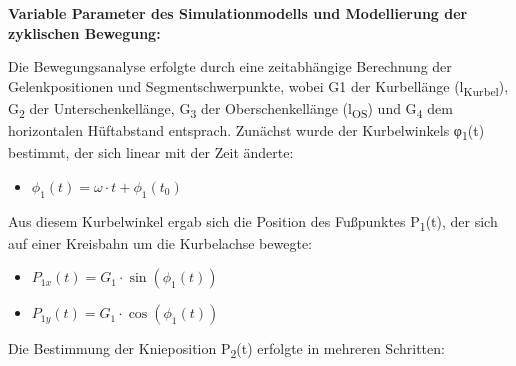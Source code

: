 \documentclass[
  letterpaper,
  DIV=11]{scrartcl}
\providecommand{\tightlist}{%
  \setlength{\itemsep}{0pt}\setlength{\parskip}{0pt}}\usepackage{longtable,booktabs,array}
\begin{document}
\textbf{Variable Parameter des Simulationmodells und Modellierung der
zyklischen Bewegung:}

Die Bewegungsanalyse erfolgte durch eine zeitabhängige Berechnung der
Gelenkpositionen und Segmentschwerpunkte, wobei G1 der Kurbellänge
(l\textsubscript{Kurbel}), G\textsubscript{2} der Unterschenkellänge,
G\textsubscript{3} der Oberschenkellänge (l\textsubscript{OS}) und
G\textsubscript{4} dem horizontalen Hüftabstand entsprach. Zunächst
wurde der Kurbelwinkels φ\textsubscript{1}(t) bestimmt, der sich linear
mit der Zeit änderte:

\begin{itemize}
\tightlist
\item
  \(\phi_1(t) = \omega \cdot t + \phi_1(t_0)\)
\end{itemize}

Aus diesem Kurbelwinkel ergab sich die Position des Fußpunktes
P\textsubscript{1}(t), der sich auf einer Kreisbahn um die Kurbelachse
bewegte:

\begin{itemize}
\tightlist
\item
  \(P_{1x}(t) = G_1 \cdot \sin(\phi_1(t))\)
\item
  \(P_{1y}(t) = G_1 \cdot \cos(\phi_1(t))\)
\end{itemize}

Die Bestimmung der Knieposition P\textsubscript{2}(t) erfolgte in
mehreren Schritten:
\end{document}
